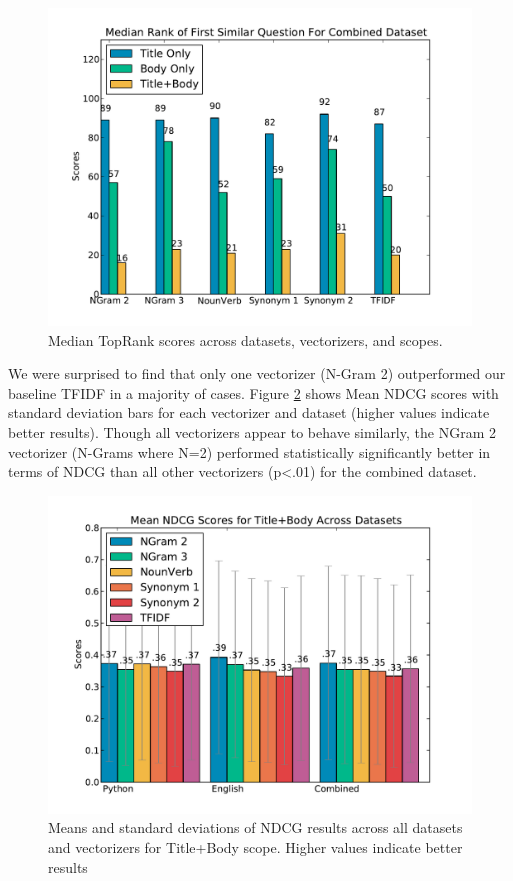 \documentclass{acm_proc_article-sp}
\begin{document}
\begin{figure}[!htb]
\endminipage\hfill
{}%
\includegraphics[width=1.1\linewidth]{images/Combined_all-toprank-medians_plot.pdf}

\endminipage

\caption{Median TopRank scores across datasets, vectorizers, and scopes.}
\label{fig:toprankmedians}
\centering
\end{figure}



We were surprised to find that only one vectorizer (N-Gram 2) outperformed our baseline TFIDF in a majority of cases. Figure \ref{fig:allmeans} shows Mean NDCG scores with standard deviation bars for each vectorizer and dataset (higher values indicate better results). Though all vectorizers appear to behave similarly, the NGram 2 vectorizer (N-Grams where N=2) performed statistically significantly better in terms of NDCG than all other vectorizers (p<.01) for the combined dataset.

\begin{figure}[h]
\centering
\includegraphics[width=1\columnwidth]{images/all-means-by-dataset_plot.pdf}
\caption{Means and standard deviations of NDCG results across all datasets and vectorizers for Title+Body scope. Higher values indicate better results}
\label{fig:allmeans}
\end{figure}
\end{document}
